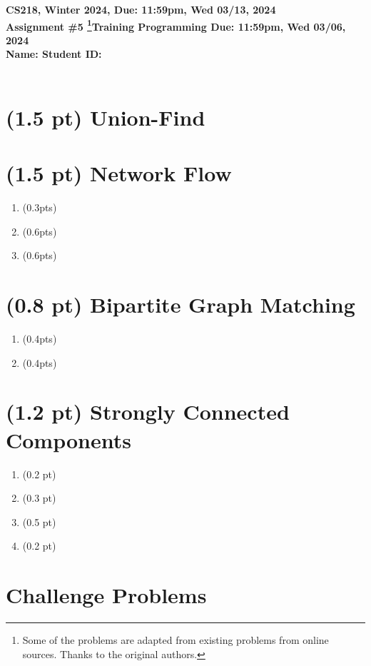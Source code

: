 \documentclass{article}[12pt]
\newcommand{\programmingdeadline}{{11:59pm, Wed 03/06, 2024}}
\newcommand{\deadline}{{11:59pm, Wed 03/13, 2024}}
\newcommand{\assigntitle}[1]{{
  \noindent \large \bf
  CS218, Winter 2024, \hfill Due: {\deadline}\\
  Assignment \##1 \footnote{Some of the problems are adapted from existing problems from online sources. Thanks to the original authors.}\hfill Training Programming Due: {\programmingdeadline}\\
  Name: %
  \hspace{3.2in}
  Student ID: %
  \\
  [-.05in]
  \mbox{}\hrulefill \mbox{}\\}}
\begin{document}
\assigntitle{5}{}
\date{}

\section{(1.5 pt) Union-Find}

\section{(1.5 pt) Network Flow}

\begin{enumerate}
  \item (0.3pts) 
  \item (0.6pts) 
  \item (0.6pts) 
\end{enumerate}

\section{(0.8 pt) Bipartite Graph Matching}

\begin{enumerate}
  \item (0.4pts) 
  \item (0.4pts) 
\end{enumerate}

\section{(1.2 pt) Strongly Connected Components}

\begin{enumerate}
  \item (0.2 pt)
  \item (0.3 pt)
  \item (0.5 pt)
  \item (0.2 pt)
\end{enumerate}


\section{Challenge Problems}
\end{document}

